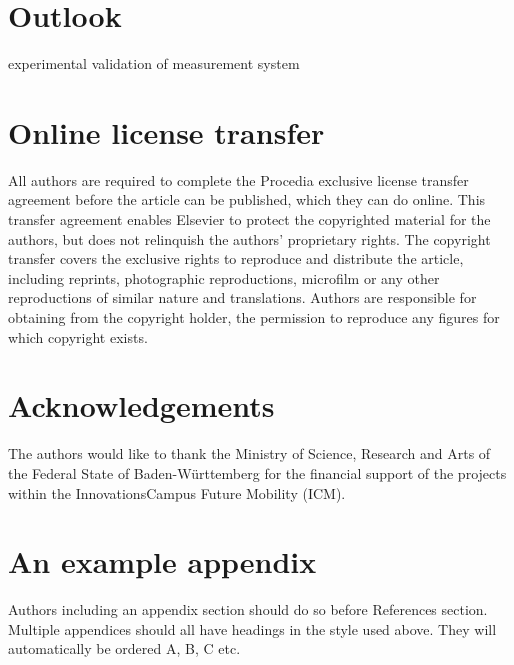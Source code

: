 \documentclass[5p,times,procedia]{elsarticle}
\begin{document}
\section{Outlook}
experimental validation of measurement system


\section{Online license transfer}
All authors are required to complete the Procedia exclusive license transfer agreement before the article can be published, which they can do online. This transfer agreement enables Elsevier to protect the copyrighted material for the authors, but does not relinquish the authors' proprietary rights. The copyright transfer covers the exclusive rights to reproduce and distribute the article, including reprints, photographic reproductions, microfilm or any other reproductions of similar nature and translations. Authors are responsible for obtaining from the copyright holder, the permission to reproduce any figures for which copyright exists.

\vfill\pagebreak

\section*{Acknowledgements}
The authors would like to thank the Ministry of Science, Research and Arts of the Federal State of Baden-Württemberg for the financial support of the projects within the InnovationsCampus Future Mobility (ICM).




\appendix
\section{An example appendix}
Authors including an appendix section should do so before References section. Multiple appendices should all have headings in the style used above. They will automatically be ordered A, B, C etc.






\end{document}
